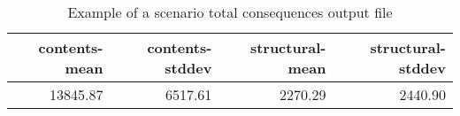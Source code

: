 \begin{table}[htbp]
\centering
\begin{tabular}{rrrr}

\hline
\rowcolor{lightgray}
\bf{contents-mean} & \bf{contents-stddev} & \bf{structural-mean} & \bf{structural-stddev} \\
\hline
13845.87 & 6517.61 & 2270.29 & 2440.90 \\
\hline

\end{tabular}
\caption{Example of a scenario total consequences output file}
\label{output:scenario_consequence_total}
\end{table}